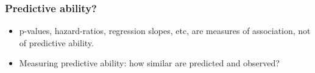 







\begin{frame}
\frametitle{Predictive ability?}
\begin{itemize}
\item p-values, hazard-ratios, regression slopes, etc, are measures of
  association, not of predictive ability.
\vspace*{20pt}

\item Measuring predictive ability: how similar are predicted and observed?

\end{itemize}
\end{frame}



